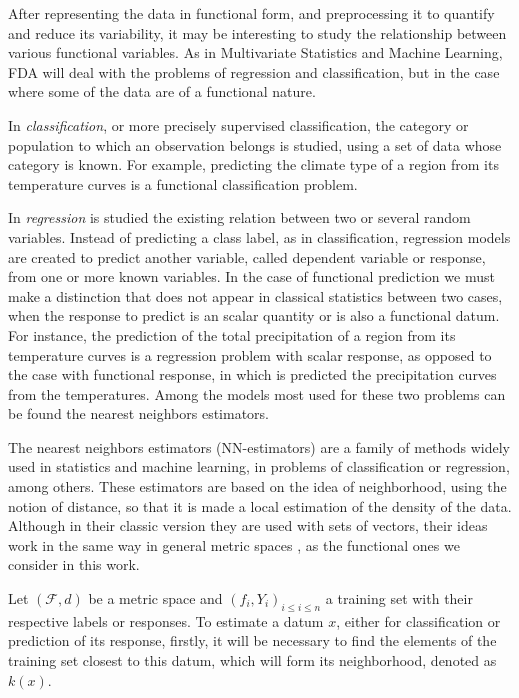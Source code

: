 
After representing the data in functional form, and preprocessing it to quantify and
reduce its variability, it may be interesting to study the relationship between
various functional variables. As in Multivariate Statistics and Machine Learning,
FDA will deal with the problems of regression and classification, but in the case
where some of the data are of a functional nature.


In \textit{classification}, or more precisely supervised classification, the category or
population to which an observation belongs is studied, using a set of data whose
category is known. For example, predicting the climate type of a region from
its temperature curves is a functional classification problem.

In \textit{regression} is studied the existing relation between two or several
random variables. Instead of predicting a class label, as in classification,
regression models are created to predict another variable, called dependent
variable or response, from one or more known variables. In the case of
functional prediction we must make a distinction that does not appear in
classical statistics between two cases, when the response to predict is an
scalar quantity or is also a functional datum. For instance, the prediction of
the total precipitation of a region from its temperature curves is a regression
problem with scalar response, as opposed to the case with functional response,
in which is predicted the precipitation curves from the temperatures.
Among the models most used for these two problems can be found the nearest
neighbors estimators.

The nearest neighbors estimators (NN-estimators) are a family of methods widely
used in statistics and machine learning, in problems of classification or
regression, among others. These estimators are based on the idea of
neighborhood, using the notion of distance, so that it is made a local
estimation of the density of the data.
Although in their classic version they are used with sets of vectors,
their ideas work in the same way in general metric
spaces \cite{baillo2010}, as the functional ones we consider in this work.

Let $(\mathcal{F}, d)$ be a metric space and
$(f_i, {Y}_i)_{i \le i \le n}$ a training set with their
respective labels or responses.
To estimate a datum $x$, either for classification or prediction of its
response, firstly, it will be necessary to find the elements of the training set
closest to this datum, which will form its neighborhood, denoted as $k(x)$.

